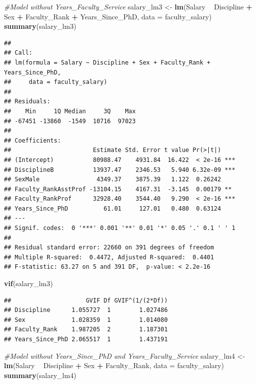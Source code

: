 \documentclass[]{article}
\newenvironment{Shaded}{\begin{snugshade}}{\end{snugshade}}
\newcommand{\KeywordTok}[1]{\textcolor[rgb]{0.13,0.29,0.53}{\textbf{#1}}}
\newcommand{\DataTypeTok}[1]{\textcolor[rgb]{0.13,0.29,0.53}{#1}}
\newcommand{\StringTok}[1]{\textcolor[rgb]{0.31,0.60,0.02}{#1}}
\newcommand{\CommentTok}[1]{\textcolor[rgb]{0.56,0.35,0.01}{\textit{#1}}}
\newcommand{\OperatorTok}[1]{\textcolor[rgb]{0.81,0.36,0.00}{\textbf{#1}}}
\newcommand{\NormalTok}[1]{#1}
\begin{document}
\begin{Shaded}
\begin{Highlighting}[]
\CommentTok{#Model without Years_Faculty_Service }
\NormalTok{salary_lm3 <-}\StringTok{ }\KeywordTok{lm}\NormalTok{(Salary }\OperatorTok{~}\StringTok{ }\NormalTok{Discipline }\OperatorTok{+}\StringTok{ }\NormalTok{Sex }\OperatorTok{+}\StringTok{ }\NormalTok{Faculty_Rank }\OperatorTok{+}\StringTok{ }\NormalTok{Years_Since_PhD, }\DataTypeTok{data =}\NormalTok{ faculty_salary)}
\KeywordTok{summary}\NormalTok{(salary_lm3)}
\end{Highlighting}
\end{Shaded}

\begin{verbatim}
## 
## Call:
## lm(formula = Salary ~ Discipline + Sex + Faculty_Rank + Years_Since_PhD, 
##     data = faculty_salary)
## 
## Residuals:
##    Min     1Q Median     3Q    Max 
## -67451 -13860  -1549  10716  97023 
## 
## Coefficients:
##                       Estimate Std. Error t value Pr(>|t|)    
## (Intercept)           80988.47    4931.84  16.422  < 2e-16 ***
## DisciplineB           13937.47    2346.53   5.940 6.32e-09 ***
## SexMale                4349.37    3875.39   1.122  0.26242    
## Faculty_RankAsstProf -13104.15    4167.31  -3.145  0.00179 ** 
## Faculty_RankProf      32928.40    3544.40   9.290  < 2e-16 ***
## Years_Since_PhD          61.01     127.01   0.480  0.63124    
## ---
## Signif. codes:  0 '***' 0.001 '**' 0.01 '*' 0.05 '.' 0.1 ' ' 1
## 
## Residual standard error: 22660 on 391 degrees of freedom
## Multiple R-squared:  0.4472, Adjusted R-squared:  0.4401 
## F-statistic: 63.27 on 5 and 391 DF,  p-value: < 2.2e-16
\end{verbatim}

\begin{Shaded}
\begin{Highlighting}[]
\KeywordTok{vif}\NormalTok{(salary_lm3)}
\end{Highlighting}
\end{Shaded}

\begin{verbatim}
##                     GVIF Df GVIF^(1/(2*Df))
## Discipline      1.055727  1        1.027486
## Sex             1.028359  1        1.014080
## Faculty_Rank    1.987205  2        1.187301
## Years_Since_PhD 2.065517  1        1.437191
\end{verbatim}

\begin{Shaded}
\begin{Highlighting}[]
\CommentTok{#Model without Years_Since_PhD and Years_Faculty_Service}
\NormalTok{salary_lm4 <-}\StringTok{ }\KeywordTok{lm}\NormalTok{(Salary }\OperatorTok{~}\StringTok{ }\NormalTok{Discipline }\OperatorTok{+}\StringTok{ }\NormalTok{Sex }\OperatorTok{+}\StringTok{ }\NormalTok{Faculty_Rank, }\DataTypeTok{data =}\NormalTok{ faculty_salary)}
\KeywordTok{summary}\NormalTok{(salary_lm4)}
\end{Highlighting}
\end{Shaded}
\end{document}
